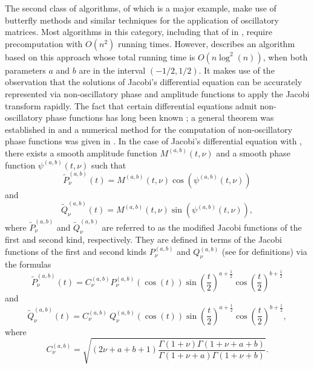 \documentclass[11pt]{article}
\begin{document}
The second class of algorithms, of which \cite{Oneil-Rokhlin} is a major example,
make use of butterfly methods and similar techniques for the application of oscillatory
matrices.   Most algorithms in this category, including that of in \cite{Oneil-Rokhlin}, require precomputation with $O(n^2)$   running times.
However, \cite{Jacobi} describes an algorithm based on this approach whose total running time is $O(n \log^2(n))$, when both parameters $a$ and $b$ are in the interval $(-1/2,1/2)$.
It makes use of  the observation that the solutions of  Jacobi's differential equation can be accurately represented via 
non-oscillatory phase and amplitude functions to apply the Jacobi transform rapidly.
The fact that certain differential equations admit non-oscillatory phase functions has long been known \cite{DLMF}; a general theorem
 was established in \cite{HEITMAN20151} 
and a numerical method for the computation of non-oscillatory phase functions was 
given in \cite{BremerKummer}.
In the case of Jacobi's differential equation with {\color{blue}{$t\in [0,\pi]$ and $\nu > 0$}},
there exists a smooth amplitude function $M^{(a,b)}(t,\nu)$ and a smooth phase function $\psi^{(a,b)}(t,\nu)$ such that
\begin{equation}
\label{eq:jacnonosci}
\tilde{P}_{\nu}^{(a,b)}(t) = M^{(a,b)}(t,\nu)\cos(\psi^{(a,b)}(t,\nu))
\end{equation}  
and
\begin{equation}
\label{eq:jacnonosci2}
\tilde{Q}_{\nu}^{(a,b)}(t) = M^{(a,b)}(t,\nu)\sin(\psi^{(a,b)}(t,\nu)),
\end{equation}  
where $\tilde{P}_{\nu}^{(a,b)}$ and $\tilde{Q}_{\nu}^{(a,b)}$ are referred to as the modified Jacobi functions of the first and second kind, respectively.
They are defined in terms of the Jacobi functions of the first and second kinds $P_\nu^{(a,b)}$ and  $Q_\nu^{(a,b)}$ (see \cite{DLMF} for definitions)
via the formulas
\begin{equation}
\label{eq:modifiedjac}
\tilde{P}_{\nu}^{(a,b)}(t) = C_{\nu}^{(a,b)}P_{\nu}^{(a,b)}(\cos(t))\sin\left(\frac{t}{2}\right)^{a+\frac{1}{2}}\cos\left(\frac{t}{2}\right)^{b+\frac{1}{2}}
\end{equation}
and
\begin{equation}
\tilde{Q}_\nu^{(a,b)}(t) = 
C_{\nu}^{(a,b)} \ Q_\nu^{(a,b)}\left(\cos(t)\right) 
\sin\left(\frac{t}{2}\right)^{a+\frac{1}{2}}
\cos\left(\frac{t}{2}\right)^{b+\frac{1}{2}},
\label{eq:modifiedjac2}
\end{equation}
where
\begin{equation}
\label{eq:C}
C_{\nu}^{(a,b)} = \sqrt{(2\nu+a+b+1)\frac{\Gamma(1+\nu)\Gamma(1+\nu+a+b)}{\Gamma(1+\nu+a)\Gamma(1+\nu+b)}}.
\end{equation}
\end{document}
